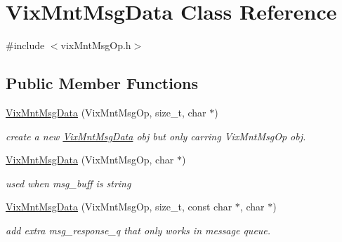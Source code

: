 \hypertarget{class_vix_mnt_msg_data}{}\section{Vix\+Mnt\+Msg\+Data Class Reference}
\label{class_vix_mnt_msg_data}


{\ttfamily \#include $<$vix\+Mnt\+Msg\+Op.\+h$>$}

\subsection*{Public Member Functions}
\begin{DoxyCompactItemize}
\item 
\hyperlink{class_vix_mnt_msg_data_a80cb5c90791e78df8df6d0968667a731}{Vix\+Mnt\+Msg\+Data} (Vix\+Mnt\+Msg\+Op, size\+\_\+t, char $\ast$)
\begin{DoxyCompactList}\small\item\em create a new \hyperlink{class_vix_mnt_msg_data}{Vix\+Mnt\+Msg\+Data} obj but only carring Vix\+Mnt\+Msg\+Op obj. \end{DoxyCompactList}\item 
\hyperlink{class_vix_mnt_msg_data_a2ea404d6e5eca9b6193b679909054762}{Vix\+Mnt\+Msg\+Data} (Vix\+Mnt\+Msg\+Op, char $\ast$)
\begin{DoxyCompactList}\small\item\em used when msg\+\_\+buff is string \end{DoxyCompactList}\item 
\hyperlink{class_vix_mnt_msg_data_a24404fece8348b4267c9bff2eff2dcb4}{Vix\+Mnt\+Msg\+Data} (Vix\+Mnt\+Msg\+Op, size\+\_\+t, const char $\ast$, char $\ast$)
\begin{DoxyCompactList}\small\item\em add extra msg\+\_\+response\+\_\+q that only works in message queue. \end{DoxyCompactList}\end{DoxyCompactItemize}
